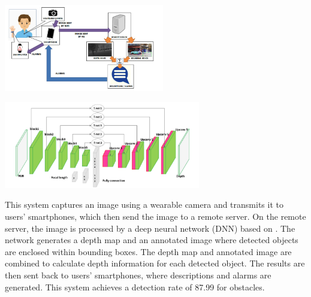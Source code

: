\documentclass{article} %
\begin{document}
\begin{minipage}{.5\textwidth}
    \centering
    \includegraphics[height=3.8cm]{Figs/bauer-sensor.png}
    \label{Bauer2020-figure}
\end{minipage}
\begin{minipage}{.5\textwidth}
    \centering
    \includegraphics[height=3.8cm]{Figs/FocalDLPicAr.png}
    \label{FocalDLPicAr}
\end{minipage}

This system captures an image using a wearable camera and transmits it to users' smartphones, which then send the image to a remote server. On the remote server, the image is processed by a deep neural network (DNN) based on \cite{He2015}. The network generates a depth map and an annotated image where detected objects are enclosed within bounding boxes. The depth map and annotated image are combined to calculate depth information for each detected object. The results are then sent back to users' smartphones, where descriptions and alarms are generated. This system achieves a detection rate of 87.99 for obstacles.
\end{document}
